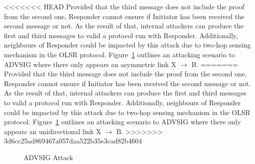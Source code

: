 \begin{flushleft}
<<<<<<< HEAD
Provided that the third message does not include the proof from the second one, Responder cannot ensure if Initiator has been received the second message or not. As the result of that, internal attackers can produce the first and third messages to valid a protocol run with Responder. Additionally,  neighbours of Responder could be impacted by this attack due to two-hop sensing mechanism in the OLSR protocol.  Figure~\ref{advsigattack3} outlines an attacking scenario to ADVSIG where there only appears an asymmetric link X $\rightarrow$ B.
=======
Provided that the third message does not include the proof from the second one, Responder cannot ensure if Initiator has been received the second message or not. As the result of that, internal attackers can produce the first and third messages to valid a protocol run with Responder. Additionally,  neighbours of Responder could be impacted by this attack due to two-hop sensing mechanism in the OLSR protocol.  Figure~\ref{advsigattack3} outlines an attacking scenario to ADVSIG where there only appears an unidirectional link X $\rightarrow$ B.
>>>>>>> 3d6cc25ad869467a057daa522b35e3cad82b4604

\begin{figure}
		\caption{ADVSIG Attack }\label{advsigattack3}
        \centering

	    \centering


\end{figure}
\end{flushleft}
